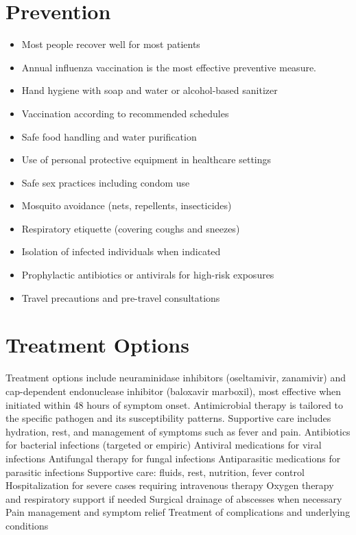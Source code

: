\section{Prevention}
\begin{itemize}[noitemsep]
  \item Most people recover well for most patients
  \item Annual influenza vaccination is the most effective preventive measure.
  \item Hand hygiene with soap and water or alcohol-based sanitizer
  \item Vaccination according to recommended schedules
  \item Safe food handling and water purification
  \item Use of personal protective equipment in healthcare settings
  \item Safe sex practices including condom use
  \item Mosquito avoidance (nets, repellents, insecticides)
  \item Respiratory etiquette (covering coughs and sneezes)
  \item Isolation of infected individuals when indicated
  \item Prophylactic antibiotics or antivirals for high-risk exposures
  \item Travel precautions and pre-travel consultations
\end{itemize}
\section{Treatment Options}
Treatment options include neuraminidase inhibitors (oseltamivir, zanamivir) and cap-dependent endonuclease inhibitor (baloxavir marboxil), most effective when initiated within 48 hours of symptom onset. Antimicrobial therapy is tailored to the specific pathogen and its susceptibility patterns. Supportive care includes hydration, rest, and management of symptoms such as fever and pain. Antibiotics for bacterial infections (targeted or empiric) Antiviral medications for viral infections Antifungal therapy for fungal infections Antiparasitic medications for parasitic infections Supportive care: fluids, rest, nutrition, fever control Hospitalization for severe cases requiring intravenous therapy Oxygen therapy and respiratory support if needed Surgical drainage of abscesses when necessary Pain management and symptom relief Treatment of complications and underlying conditions

